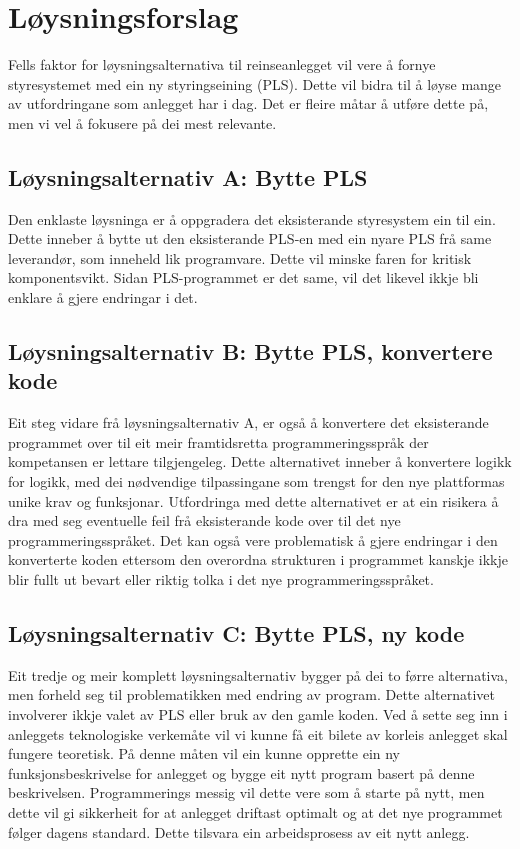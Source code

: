 \newpage
\section{Løysningsforslag}

Fells faktor for løysningsalternativa til reinseanlegget vil vere å fornye
styresystemet med ein ny styringseining (PLS). 
Dette vil bidra til å løyse mange av utfordringane som anlegget har i dag.
Det er fleire måtar å utføre dette på, men vi vel å fokusere på dei mest relevante.
\newline
\subsection{Løysningsalternativ A: Bytte PLS}
Den enklaste løysninga er å oppgradera det eksisterande styresystem ein til ein. 
Dette inneber å bytte ut den eksisterande PLS-en med ein nyare PLS frå same leverandør, som inneheld lik programvare.
Dette vil minske faren for kritisk komponentsvikt. Sidan PLS-programmet er det same, 
vil det likevel ikkje bli enklare å gjere endringar i det.

\subsection{Løysningsalternativ B: Bytte PLS, konvertere kode}
Eit steg vidare frå løysningsalternativ A, er også å konvertere det eksisterande programmet over til eit meir
framtidsretta programmeringsspråk der kompetansen er lettare tilgjengeleg. Dette alternativet inneber å konvertere logikk for logikk,
med dei nødvendige tilpassingane som trengst for den nye plattformas unike krav og funksjonar.
\newline \newline
Utfordringa med dette alternativet er at ein risikera å dra med seg eventuelle feil frå eksisterande
kode over til det nye programmeringsspråket. Det kan også vere problematisk å gjere endringar
i den konverterte koden ettersom den overordna strukturen i programmet
kanskje ikkje blir fullt ut bevart eller riktig tolka i det nye programmeringsspråket.

\subsection{Løysningsalternativ C: Bytte PLS, ny kode}
Eit tredje og meir komplett løysningsalternativ bygger på dei to førre alternativa, men forheld seg til problematikken med endring av program.
Dette alternativet involverer ikkje valet av PLS eller bruk av den gamle koden.
\newline \newline
Ved å sette seg inn i anleggets teknologiske verkemåte vil vi kunne få eit bilete av korleis anlegget skal fungere teoretisk.
På denne måten vil ein kunne opprette ein ny funksjonsbeskrivelse for anlegget og bygge eit nytt program basert på denne beskrivelsen.
Programmerings messig vil dette vere som å starte på nytt, men dette vil gi sikkerheit for at anlegget driftast optimalt og at det nye programmet følger
dagens standard. Dette tilsvara ein arbeidsprosess av eit nytt anlegg.

